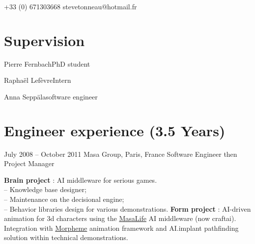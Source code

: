 \documentclass{tccv}
\begin{document}
\begin{eventlist}

\end{eventlist}

    {+33 (0) 671303668}
    {stevetonneau@hotmail.fr}


\section{Supervision}

\begin{factlist}
\item{Pierre Fernbach}{PhD student}
\item{Rapha\"el Lef\`evre}{Intern}
\item{Anna Sepp\"ala}{software engineer}
\end{factlist}


\section{Engineer experience (3.5 Years)}

\begin{eventlist}

\item{July 2008 -- October 2011}
     {Masa Group, Paris, France}
     {Software Engineer then Project Manager}

\textbf{Brain project} : AI middleware for serious games.
\\ -- Knowledge base designer;
\\ -- Maintenance on the decisional engine;
\\ -- Behavior libraries design for various demonstrations.
\textbf{Form project} : AI-driven animation for 3d characters using the \href{http://www.craft.ai/}{MasaLife} AI middleware (now craftai).
Integration with \href{http://www.naturalmotion.com/products/morpheme/}{Morpheme} animation framework and
AI.implant pathfinding
solution within technical demonstrations.



\end{eventlist}
\end{document}
